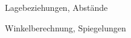 

\newcommand{\vektor}[1]{\ensuremath\begin{pmatrix} #1 \end{pmatrix}}


\begin{inhalt}
	\item Lagebeziehungen, Abstände
	\item Winkelberechnung, Spiegelungen
\end{inhalt}




